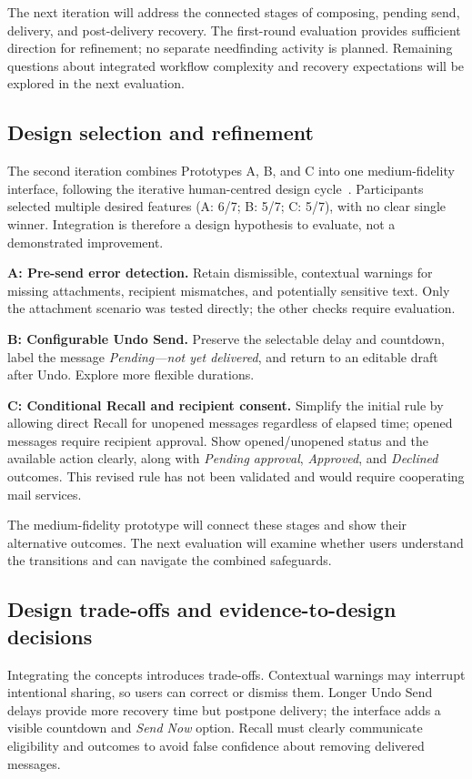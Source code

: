 \documentclass[letterpaper]{jdf}
\begin{document}
The next iteration will address the connected stages of composing, pending send, delivery, and post-delivery recovery. The first-round evaluation provides sufficient direction for refinement; no separate needfinding activity is planned. Remaining questions about integrated workflow complexity and recovery expectations will be explored in the next evaluation.

\subsection{Design selection and refinement}
The second iteration combines Prototypes A, B, and C into one medium-fidelity interface, following the iterative human-centred design cycle~\citep{iso-hcd}. Participants selected multiple desired features (A: 6/7; B: 5/7; C: 5/7), with no clear single winner. Integration is therefore a design hypothesis to evaluate, not a demonstrated improvement.

\textbf{A: Pre-send error detection.} Retain dismissible, contextual warnings for missing attachments, recipient mismatches, and potentially sensitive text. Only the attachment scenario was tested directly; the other checks require evaluation.

\textbf{B: Configurable Undo Send.} Preserve the selectable delay and countdown, label the message \emph{Pending---not yet delivered}, and return to an editable draft after Undo. Explore more flexible durations.

\textbf{C: Conditional Recall and recipient consent.} Simplify the initial rule by allowing direct Recall for unopened messages regardless of elapsed time; opened messages require recipient approval. Show opened/unopened status and the available action clearly, along with \emph{Pending approval}, \emph{Approved}, and \emph{Declined} outcomes. This revised rule has not been validated and would require cooperating mail services.

The medium-fidelity prototype will connect these stages and show their alternative outcomes. The next evaluation will examine whether users understand the transitions and can navigate the combined safeguards.

\subsection{Design trade-offs and evidence-to-design decisions}
Integrating the concepts introduces trade-offs. Contextual warnings may interrupt intentional sharing, so users can correct or dismiss them. Longer Undo Send delays provide more recovery time but postpone delivery; the interface adds a visible countdown and \emph{Send Now} option. Recall must clearly communicate eligibility and outcomes to avoid false confidence about removing delivered messages.
\end{document}
